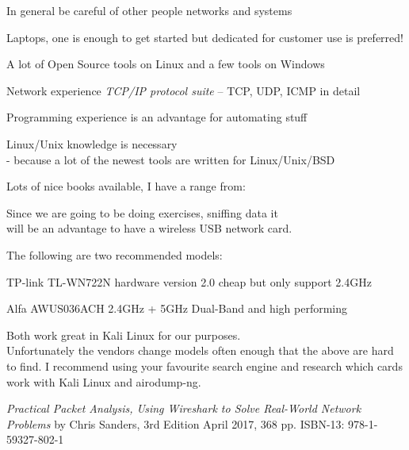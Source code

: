 \documentclass[Screen16to9,17pt]{foils}
\begin{document}
\centerline{In general be careful of other people networks and systems}




\begin{list1}

\item Laptops, one is enough to get started but dedicated for customer use is preferred!
\begin{list2}
\item A lot of Open Source tools on Linux and a few tools on Windows
\item Network experience \emph{TCP/IP protocol suite} -- TCP, UDP, ICMP in detail
\item Programming experience is an advantage for automating stuff
\item Linux/Unix knowledge is necessary \\
- because a lot of the newest tools are written for Linux/Unix/BSD
\item Lots of nice books available, I have a range from:

\end{list2}
\end{list1}


Since we are going to be doing exercises, sniffing data it \\
will be an advantage to have a wireless USB network card.
\begin{list2}
\item The following are two recommended models:
\item TP-link TL-WN722N hardware version 2.0 cheap but only support 2.4GHz
\item Alfa AWUS036ACH 2.4GHz + 5GHz Dual-Band and high performing
\item Both work great in Kali Linux for our purposes.\\
Unfortunately the vendors change models often enough that the above are hard to find. I recommend using your favourite search engine and research which cards work with Kali Linux and airodump-ng.
\end{list2}


\emph{Practical Packet Analysis,
Using Wireshark to Solve Real-World Network Problems}
by Chris Sanders, 3rd Edition
April 2017, 368 pp.
ISBN-13:
978-1-59327-802-1
\end{document}
